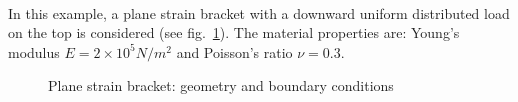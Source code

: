 \paragraph{}
In this example, a plane strain bracket with a downward uniform distributed load on the top is considered (see fig.~\ref{adp_fig:ex_bracket_geo_bc}).
The material properties are: Young’s modulus $E = 2\times 10^5 N/m^2$ and Poisson’s ratio $\nu = 0.3$.
    \begin{figure}[H]
        \centering
        \begin{subfigure}[b]{1\linewidth}
            \centering
        \end{subfigure}
        \begin{subfigure}[b]{1\linewidth}
            \centering
        \end{subfigure}
        \caption{ Plane strain bracket: geometry and boundary conditions}
        \label{adp_fig:ex_bracket_geo_bc}
    \end{figure}

